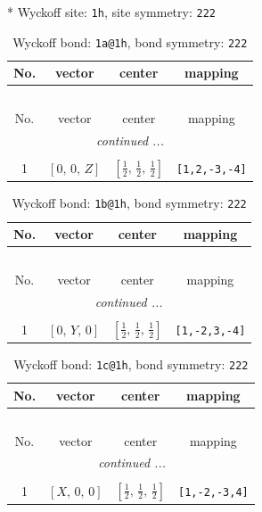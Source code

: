 \documentclass[fleqn,8pt]{jsarticle}
\begin{document}
* Wyckoff site: {\tt 1h}, site symmetry: {\tt 222}
\renewcommand{\arraystretch}{1.2}
\begin{longtable}{cccc}
\caption{Wyckoff bond: {\tt 1a@1h}, bond symmetry: {\tt 222}}
 \\
 \hline \hline
No. & vector & center & mapping \\ \hline \endfirsthead

\multicolumn{3}{l}{\tablename\ \thetable{}} \\
 \hline \hline
No. & vector & center & mapping \\ \hline \endhead

 \hline \hline
\multicolumn{3}{r}{\footnotesize\it continued ...} \\ \endfoot

 \hline \hline
\multicolumn{3}{r}{} \\ \endlastfoot

1 & $\left[ 0,\, 0,\, Z \right]$ & $\left[ \frac{1}{2},\, \frac{1}{2},\, \frac{1}{2} \right]$ & {\tt [1,2,-3,-4]} \\
\end{longtable}
\renewcommand{\arraystretch}{1.2}
\begin{longtable}{cccc}
\caption{Wyckoff bond: {\tt 1b@1h}, bond symmetry: {\tt 222}}
 \\
 \hline \hline
No. & vector & center & mapping \\ \hline \endfirsthead

\multicolumn{3}{l}{\tablename\ \thetable{}} \\
 \hline \hline
No. & vector & center & mapping \\ \hline \endhead

 \hline \hline
\multicolumn{3}{r}{\footnotesize\it continued ...} \\ \endfoot

 \hline \hline
\multicolumn{3}{r}{} \\ \endlastfoot

1 & $\left[ 0,\, Y,\, 0 \right]$ & $\left[ \frac{1}{2},\, \frac{1}{2},\, \frac{1}{2} \right]$ & {\tt [1,-2,3,-4]} \\
\end{longtable}
\renewcommand{\arraystretch}{1.2}
\begin{longtable}{cccc}
\caption{Wyckoff bond: {\tt 1c@1h}, bond symmetry: {\tt 222}}
 \\
 \hline \hline
No. & vector & center & mapping \\ \hline \endfirsthead

\multicolumn{3}{l}{\tablename\ \thetable{}} \\
 \hline \hline
No. & vector & center & mapping \\ \hline \endhead

 \hline \hline
\multicolumn{3}{r}{\footnotesize\it continued ...} \\ \endfoot

 \hline \hline
\multicolumn{3}{r}{} \\ \endlastfoot

1 & $\left[ X,\, 0,\, 0 \right]$ & $\left[ \frac{1}{2},\, \frac{1}{2},\, \frac{1}{2} \right]$ & {\tt [1,-2,-3,4]} \\
\end{longtable}
\end{document}
